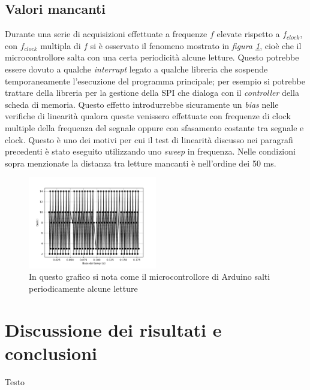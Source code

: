 \documentclass[journal]{IEEEtran}
\begin{document}
\subsection{Valori mancanti}
Durante una serie di acquisizioni effettuate a frequenze $f$ elevate rispetto a $f_{clock}$, con $f_{clock}$ multipla di $f$ si è osservato il fenomeno mostrato in \textit{figura \ref{fig:missing}}, cioè che il microcontrollore salta con una certa periodicità alcune letture. Questo potrebbe essere dovuto a qualche \textit{interrupt} legato a qualche libreria che sospende temporaneamente l'esecuzione del programma principale; per esempio si potrebbe trattare della libreria per la gestione della SPI che dialoga con il \textit{controller} della scheda di memoria. Questo effetto introdurrebbe sicuramente un \textit{bias} nelle verifiche di linearità qualora queste venissero effettuate con frequenze di clock multiple della frequenza del segnale oppure con sfasamento costante tra segnale e clock. Questo è uno dei motivi per cui il test di linearità discusso nei paragrafi precedenti è stato eseguito utilizzando uno \textit{sweep} in frequenza. Nelle condizioni sopra menzionate la distanza tra letture mancanti è nell'ordine dei 50 ms. 

\begin{figure}[H]%
\begin{center}
\includegraphics[width=0.50\textwidth]{analysis/output/letture_mancanti.pdf}
\caption{In questo grafico si nota come il microcontrollore di Arduino salti periodicamente alcune letture}
\label{fig:missing}
\end{center}
\end{figure}

\section{Discussione dei risultati e conclusioni}
Testo
\end{document}
